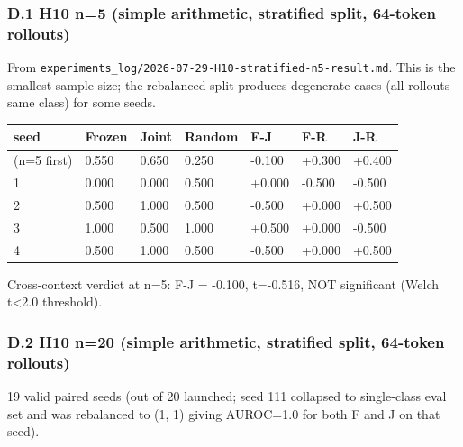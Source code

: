 \documentclass[
]{article}
\newcounter{none} %
\begin{document}
\subsubsection{D.1 H10 n=5 (simple arithmetic, stratified split,
64-token
rollouts)}\label{d.1-h10-n5-simple-arithmetic-stratified-split-64-token-rollouts}

From \texttt{experiments\_log/2026-07-29-H10-stratified-n5-result.md}.
This is the smallest sample size; the rebalanced split produces
degenerate cases (all rollouts same class) for some seeds.

{\def\LTcaptype{none} %
\begin{longtable}[]{@{}lllllll@{}}
\toprule\noalign{}
seed & Frozen & Joint & Random & F-J & F-R & J-R \\
\midrule\noalign{}
\endhead
\bottomrule\noalign{}
\endlastfoot
0 (n=5 first) & 0.550 & 0.650 & 0.250 & -0.100 & +0.300 & +0.400 \\
1 & 0.000 & 0.000 & 0.500 & +0.000 & -0.500 & -0.500 \\
2 & 0.500 & 1.000 & 0.500 & -0.500 & +0.000 & +0.500 \\
3 & 1.000 & 0.500 & 1.000 & +0.500 & +0.000 & -0.500 \\
4 & 0.500 & 1.000 & 0.500 & -0.500 & +0.000 & +0.500 \\
\end{longtable}
}

Cross-context verdict at n=5: F-J = -0.100, t=-0.516, NOT significant
(Welch t\textless2.0 threshold).

\subsubsection{D.2 H10 n=20 (simple arithmetic, stratified split,
64-token
rollouts)}\label{d.2-h10-n20-simple-arithmetic-stratified-split-64-token-rollouts}

19 valid paired seeds (out of 20 launched; seed 111 collapsed to
single-class eval set and was rebalanced to (1, 1) giving AUROC=1.0 for
both F and J on that seed).
\end{document}
